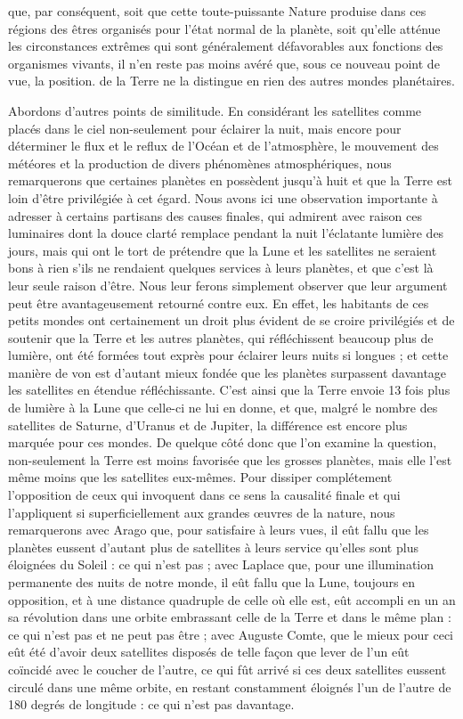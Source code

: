 \documentclass[a4paper, 11pt, oneside]{article}
\begin{document}
que, par conséquent, soit que cette toute-puissante Nature produise dans ces régions des êtres organisés pour l'état normal de la planète, soit qu'elle atténue les circonstances extrêmes qui sont généralement défavorables aux fonctions des organismes vivants, il n'en reste pas moins avéré que, sous ce nouveau point de vue, la position. de la Terre ne la distingue en rien des autres mondes planétaires.

Abordons d'autres points de similitude. En considérant les satellites comme placés dans le ciel non-seulement pour éclairer la nuit, mais encore pour déterminer le flux et le reflux de l'Océan et de l'atmosphère, le mouvement des météores et la production de divers phénomènes atmosphériques, nous remarquerons que certaines planètes en possèdent jusqu'à huit et que la Terre est loin d'être privilégiée à cet égard. Nous avons ici une observation importante à adresser à certains partisans des causes finales, qui admirent avec raison ces luminaires dont la douce clarté remplace pendant la nuit l'éclatante lumière des jours, mais qui ont le tort de prétendre que la Lune et les satellites ne seraient bons à rien s'ils ne rendaient quelques services à leurs planètes, et que c'est là leur seule raison d'être. Nous leur ferons simplement observer que leur argument peut être avantageusement retourné contre eux. En effet, les habitants de ces petits mondes ont certainement un droit plus évident de se croire privilégiés et de soutenir que la Terre et les autres planètes, qui réfléchissent beaucoup plus de lumière, ont été formées tout exprès pour éclairer leurs nuits si longues ; et cette manière de von est d'autant mieux fondée que les planètes surpassent davantage les satellites en étendue réfléchissante. C'est ainsi que la Terre envoie 13 fois plus de lumière à la Lune que celle-ci ne lui en donne, et que, malgré le nombre des satellites de Saturne, d'Uranus et de Jupiter, la différence est encore plus marquée pour ces mondes. De quelque côté donc que l'on examine la question, non-seulement la Terre est moins favorisée que les grosses planètes, mais elle l'est même moins que les satellites eux-mêmes. Pour dissiper complétement l'opposition de ceux qui invoquent dans ce sens la causalité finale et qui l'appliquent si superficiellement aux grandes œuvres de la nature, nous remarquerons avec Arago que, pour satisfaire à leurs vues, il eût fallu que les planètes eussent d'autant plus de satellites à leurs service qu'elles sont plus éloignées du Soleil : ce qui n'est pas ; avec Laplace que, pour une illumination permanente des nuits de notre monde, il eût fallu que la Lune, toujours en opposition, et à une distance quadruple de celle où elle est, eût accompli en un an sa révolution dans une orbite embrassant celle de la Terre et dans le même plan : ce qui n'est pas et ne peut pas être ; avec Auguste Comte, que le mieux pour ceci eût été d'avoir deux satellites disposés de telle façon que lever de l'un eût coïncidé avec le coucher de l'autre, ce qui fût arrivé si ces deux satellites eussent circulé dans une même orbite, en restant constamment éloignés l'un de l'autre de 180 degrés de longitude : ce qui n'est pas davantage.
\end{document}

